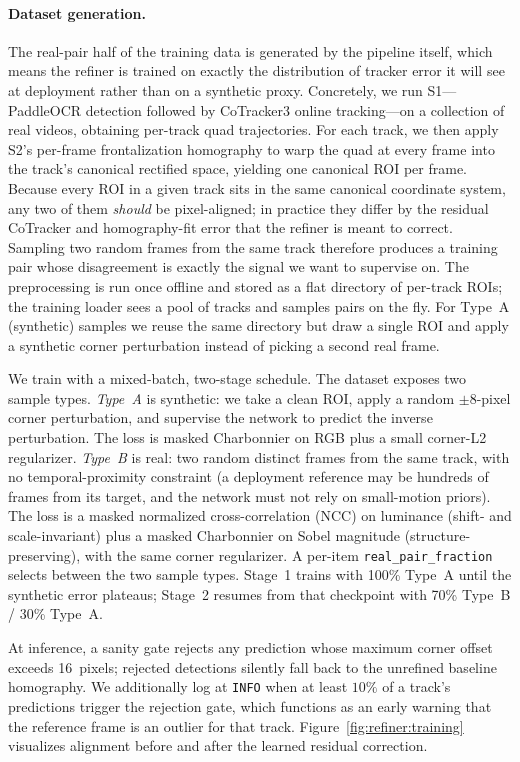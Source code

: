 \paragraph{Dataset generation.}
The real-pair half of the training data is generated by the
pipeline itself, which means the refiner is trained on exactly
the distribution of tracker error it will see at deployment rather
than on a synthetic proxy. Concretely, we run S1---PaddleOCR
detection followed by CoTracker3 online tracking---on a collection
of real videos, obtaining per-track quad trajectories. For each
track, we then apply S2's per-frame frontalization homography to
warp the quad at every frame into the track's canonical rectified
space, yielding one canonical ROI per frame. Because every ROI in
a given track sits in the same canonical coordinate system, any
two of them \emph{should} be pixel-aligned; in practice they
differ by the residual CoTracker and homography-fit error that the
refiner is meant to correct. Sampling two random frames from the
same track therefore produces a training pair whose disagreement
is exactly the signal we want to supervise on. The preprocessing
is run once offline and stored as a flat directory of per-track
ROIs; the training loader sees a pool of tracks and samples pairs
on the fly. For Type~A (synthetic) samples we reuse the same
directory but draw a single ROI and apply a synthetic corner
perturbation instead of picking a second real frame.

We train with a mixed-batch, two-stage schedule. The dataset
exposes two sample types. \emph{Type~A} is synthetic: we take a
clean ROI, apply a random $\pm 8$-pixel corner perturbation, and
supervise the network to predict the inverse perturbation. The
loss is masked Charbonnier on RGB plus a small corner-L2
regularizer. \emph{Type~B} is real: two random distinct frames
from the same track, with no temporal-proximity constraint (a
deployment reference may be hundreds of frames from its target,
and the network must not rely on small-motion priors). The
loss is a masked normalized cross-correlation (NCC) on luminance
(shift- and scale-invariant) plus a masked Charbonnier on Sobel
magnitude (structure-preserving), with the same corner
regularizer. A per-item \texttt{real\_pair\_fraction} selects
between the two sample types. Stage~1 trains with 100\%
Type~A until the synthetic error plateaus; Stage~2 resumes from
that checkpoint with 70\% Type~B / 30\% Type~A.

At inference, a sanity gate rejects any prediction whose maximum
corner offset exceeds 16~pixels; rejected detections silently fall
back to the unrefined baseline homography. We additionally log at
\texttt{INFO} when at least $10\%$ of a track's predictions
trigger the rejection gate, which functions as an early warning
that the reference frame is an outlier for that track.
Figure~\ref{fig:refiner:training} visualizes alignment before and
after the learned residual correction.

